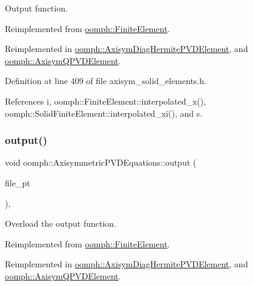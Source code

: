 Output function. 



Reimplemented from \hyperlink{classoomph_1_1FiniteElement_afa9d9b2670f999b43e6679c9dd28c457}{oomph\+::\+Finite\+Element}.



Reimplemented in \hyperlink{classoomph_1_1AxisymDiagHermitePVDElement_af5a83e5da70d404bc5e158704d757b56}{oomph\+::\+Axisym\+Diag\+Hermite\+P\+V\+D\+Element}, and \hyperlink{classoomph_1_1AxisymQPVDElement_ab9925995ad1b184df43b6eb350f3e0bd}{oomph\+::\+Axisym\+Q\+P\+V\+D\+Element}.



Definition at line 409 of file axisym\+\_\+solid\+\_\+elements.\+h.



References i, oomph\+::\+Finite\+Element\+::interpolated\+\_\+x(), oomph\+::\+Solid\+Finite\+Element\+::interpolated\+\_\+xi(), and s.

\mbox{\label{classoomph_1_1AxisymmetricPVDEquations_a3b271e966cc554c21231503f7a965549}} 
\subsubsection{\texorpdfstring{output()}{output()}\hspace{0.1cm}{\footnotesize\ttfamily [3/4]}}
{\footnotesize\ttfamily void oomph\+::\+Axisymmetric\+P\+V\+D\+Equations\+::output (\begin{DoxyParamCaption}\item[{F\+I\+LE $\ast$}]{file\+\_\+pt }\end{DoxyParamCaption})\hspace{0.3cm}{\ttfamily [inline]}, {\ttfamily [virtual]}}



Overload the output function. 



Reimplemented from \hyperlink{classoomph_1_1FiniteElement_a72cddd09f8ddbee1a20a1ff404c6943e}{oomph\+::\+Finite\+Element}.



Reimplemented in \hyperlink{classoomph_1_1AxisymDiagHermitePVDElement_a96c36dd119e64e6afb19b813ecbf33b8}{oomph\+::\+Axisym\+Diag\+Hermite\+P\+V\+D\+Element}, and \hyperlink{classoomph_1_1AxisymQPVDElement_abc2012c37faa9153f18fab2ff273bc9a}{oomph\+::\+Axisym\+Q\+P\+V\+D\+Element}.



